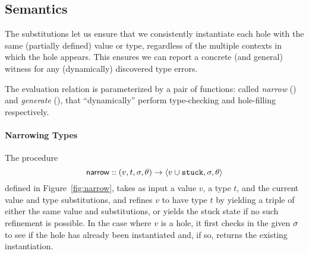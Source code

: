 \subsection{Semantics}
\label{sec:semantics}
%
%
The substitutions let us ensure that we consistently instantiate
each hole with the same (partially defined) value or type, regardless
of the multiple contexts in which the hole appears. This ensures we
can report a concrete (and general) witness for any (dynamically)
discovered type errors.

The evaluation relation is parameterized by a pair of functions:
called \emph{narrow} (\forcesym) and \emph{generate} (\gensym),
that ``dynamically'' perform type-checking and hole-filling
respectively.

\paragraph{Narrowing Types} The procedure %
$$
\mathsf{narrow} :: (v, t, \sigma, \theta) \rightarrow \langle v \cup \mathtt{stuck}, \sigma, \theta \rangle
$$
defined in Figure~\ref{fig:narrow}, takes as input a value $v$, a type
$t$, and the current value and type substitutions, and refines $v$ to
have type $t$ by yielding a triple of either the same value and
substitutions, or yields the stuck state if no such refinement is
possible. In the case where $v$ is a hole, it first checks in the given
$\sigma$ to see if the hole has already been instantiated and, if so,
returns the existing instantiation.
%
